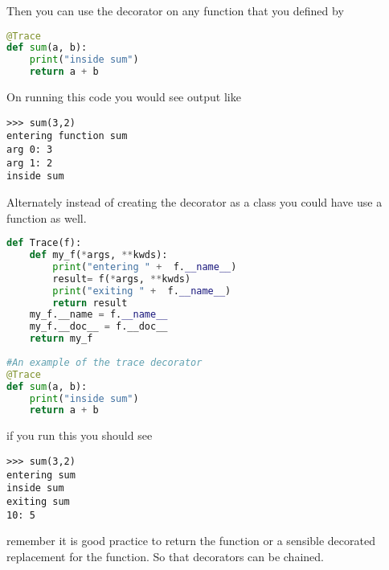 Then you can use the decorator on any function that you defined by
\lstset{basicstyle=\scriptsize, numbers=left, captionpos=b, tabsize=4}
\begin{lstlisting}[caption=Trace,language={Python},
xleftmargin=15pt, label=lst:Trace]
@Trace
def sum(a, b):
    print("inside sum")
    return a + b
\end{lstlisting}

On running this code you would see output like
\scriptsize
\begin{verbatim}
>>> sum(3,2)
entering function sum
arg 0: 3
arg 1: 2
inside sum
\end{verbatim}
\normalsize

Alternately instead of creating the decorator as a class you could have use a function as well.
\lstset{basicstyle=\scriptsize, numbers=left, captionpos=b, tabsize=4}
\begin{lstlisting}[caption=Different usage,language={Python},
xleftmargin=15pt, label=lst:differentusage]
def Trace(f):
    def my_f(*args, **kwds):
        print("entering " +  f.__name__)
        result= f(*args, **kwds)
        print("exiting " +  f.__name__)
        return result
    my_f.__name = f.__name__
    my_f.__doc__ = f.__doc__
    return my_f
 
#An example of the trace decorator
@Trace
def sum(a, b):
    print("inside sum")
    return a + b
\end{lstlisting}

if you run this you should see
\scriptsize
\begin{verbatim}
>>> sum(3,2)
entering sum
inside sum
exiting sum
10: 5
\end{verbatim}
\normalsize
remember it is good practice to return the function or a sensible decorated
replacement for the function. So that decorators can be chained.
